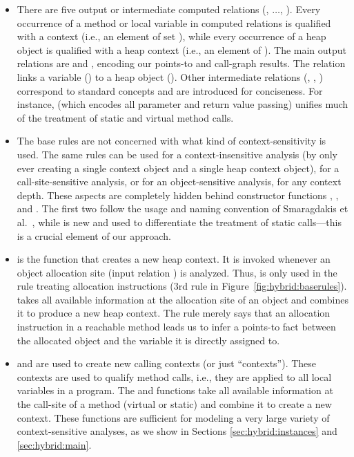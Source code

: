 \begin{itemize}
\item There are five output or intermediate computed relations (, $\ldots$, ). Every occurrence of a method or local variable in computed relations is qualified with a context (i.e., an element of set ), while every occurrence of a heap object is qualified with a heap context (i.e., an element of ). The main output relations are  and , encoding our points-to and call-graph results. The  relation links a variable () to a heap object (). Other intermediate relations (, , ) correspond to standard concepts and are introduced for conciseness. For instance,  (which encodes all parameter and return value passing) unifies much of the treatment of static and virtual method calls.

\item The base rules are not concerned with what kind of context-sensitivity is used. The same rules can be used for a context-insensitive analysis (by only ever creating a single context object and a single heap context object), for a call-site-sensitive analysis, or for an object-sensitive analysis, for any context depth. These aspects are completely hidden behind constructor functions , , and . The first two follow the usage and naming convention of Smaragdakis et al.~\cite{popl:2011:Smaragdakis}, while  is new and used to differentiate the treatment of static calls---this is a crucial element of our approach.

\item {} is the function that creates a new heap context. It is invoked whenever an object allocation site (input relation ) is analyzed. Thus,  is only used in the rule treating allocation instructions (3rd rule in Figure~\ref{fig:hybrid:baserules}).  takes all available information at the allocation site of an object and combines it to produce a new heap context. The rule merely says that an allocation instruction in a reachable method leads us to infer a points-to fact between the allocated object and the variable it is directly assigned to.

\item  {} and  are used to create new calling contexts (or just ``contexts''). These contexts are used to qualify method calls, i.e., they are applied to all local variables in a program. The  and  functions take all available information at the call-site of a method (virtual or static) and combine it to create a new context. These functions are sufficient for modeling a very large variety of context-sensitive analyses, as we show in Sections \ref{sec:hybrid:instances} and \ref{sec:hybrid:main}.


\end{itemize}
